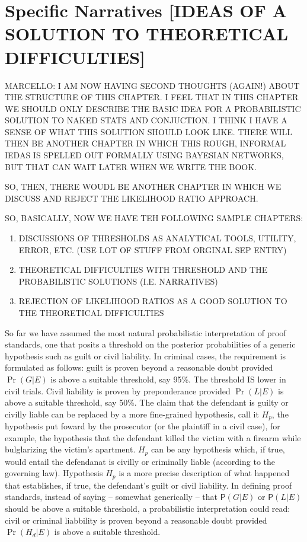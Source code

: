 \documentclass[10pt,dvipsnames,enabledeprecatedfontcommands]{scrartcl}
\newcommand{\pr}[1]{\mathsf{P}(#1)}
\begin{document}
\hypertarget{specific-narratives-ideas-of-a-solution-to-theoretical-difficulties}{%
\section{Specific Narratives {[}IDEAS OF A SOLUTION TO THEORETICAL
DIFFICULTIES{]}}\label{specific-narratives-ideas-of-a-solution-to-theoretical-difficulties}}

MARCELLO: I AM NOW HAVING SECOND THOUGHTS (AGAIN!) ABOUT THE STRUCTURE
OF THIS CHAPTER. I FEEL THAT IN THIS CHAPTER WE SHOULD ONLY DESCRIBE THE
BASIC IDEA FOR A PROBABILISTIC SOLUTION TO NAKED STATS AND CONJUCTION. I
THINK I HAVE A SENSE OF WHAT THIS SOLUTION SHOULD LOOK LIKE. THERE WILL
THEN BE ANOTHER CHAPTER IN WHICH THIS ROUGH, INFORMAL IEDAS IS SPELLED
OUT FORMALLY USING BAYESIAN NETWORKS, BUT THAT CAN WAIT LATER WHEN WE
WRITE THE BOOK.

SO, THEN, THERE WOUDL BE ANOTHER CHAPTER IN WHICH WE DISCUSS AND REJECT
THE LIKELIHOOD RATIO APPROACH.

SO, BASICALLY, NOW WE HAVE TEH FOLLOWING SAMPLE CHAPTERS:

\begin{enumerate}
\def\labelenumi{\arabic{enumi}.}
\item
  DISCUSSIONS OF THRESHOLDS AS ANALYTICAL TOOLS, UTILITY, ERROR, ETC.
  (USE LOT OF STUFF FROM ORGINAL SEP ENTRY)
\item
  THEORETICAL DIFFICULTIES WITH THRESHOLD AND THE PROBABILISTIC
  SOLUTIONS (I.E. NARRATIVES)
\item
  REJECTION OF LIKELIHOOD RATIOS AS A GOOD SOLUTION TO THE THEORETICAL
  DIFFICULTIES
\end{enumerate}

So far we have assumed the most natural probabilistic interpretation of
proof standards, one that posits a threshold on the posterior
probabilities of a generic hypothesis such as guilt or civil liability.
In criminal cases, the requirement is formulated as follows: guilt is
proven beyond a reasonable doubt provided \(\Pr(G | E)\) is above a
suitable threshold, say 95\%. The threshold IS lower in civil trials.
Civil liability is proven by preponderance provided \(\Pr(L | E)\) is
above a suitable threshold, say 50\%. The claim that the defendant is
guilty or civilly liable can be replaced by a more fine-grained
hypothesis, call it \(H_p\), the hypothesis put foward by the prosecutor
(or the plaintiff in a civil case), for example, the hypothesis that the
defendant killed the victim with a firearm while bulglarizing the
victim's apartment. \(H_p\) can be any hypothesis which, if true, would
entail the defendanat is civilly or criminally liable (according to the
governing law). Hypothesis \(H_p\) is a more precise description of what
happened that establishes, if true, the defendant's guilt or civil
liability. In defining proof standards, instead of saying -- somewhat
generically -- that \(\pr{G | E}\) or \(\pr{L | E}\) should be above a
suitable threshold, a probabilistic interpretation could read: civil or
criminal liabbility is proven beyond a reasonable doubt provided
\(\Pr(H_d | E)\) is above a suitable threshold.
\end{document}
